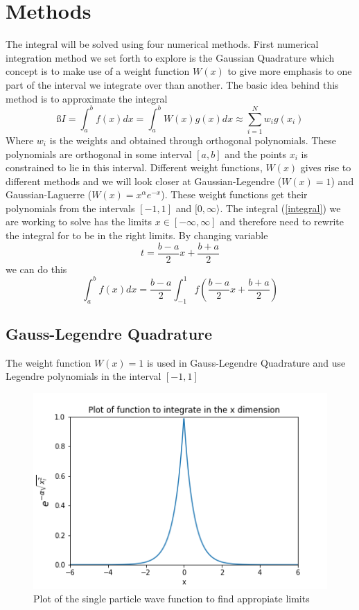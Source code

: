 \documentclass[twoside,twocolumn]{article}
\begin{document}
\section{Methods}
The integral will be solved using four numerical methods. First numerical integration method  we set forth to explore is the Gaussian Quadrature which concept is to make use of a weight function $W(x)$ to give more emphasis to one part of the interval we integrate over than another. The basic idea behind this method is to approximate the integral
\begin{equation}ß
   I = \int_{a}^{b}f(x)dx = \int_{a}^{b} W(x)g(x) dx \approx\sum_{i=1}^{N} w_ig(x_i)
\end{equation}
Where $w_i$ is the weights and obtained through orthogonal polynomials. These polynomials are orthogonal in some interval $[a,b]$ and the points $x_i$ is constrained to lie in this interval. Different weight functions, $W(x)$ gives rise to different methods and we will look  closer at Gaussian-Legendre ($W(x) = 1$) and Gaussian-Laguerre ($W(x)  = x^\alpha e^{-x}$). These weight functions get their polynomials from the intervals $[-1,1]$ and $[0,\infty\rangle$. The integral (\ref{integral})
we are working to solve has the limits $x\in[-\infty,\infty]$ and therefore need to rewrite the integral for to be in the right limits. By changing variable
\begin{equation}
		t= \frac{b-a}{2}x + \frac{b+a}{2}
\end{equation}
we can do this
\begin{equation}
		\int_a^b f(x) dx = \frac{b-a}{2} \int_{-1}^1f( \frac{b-a}{2}x + \frac{b+a}{2})
\end{equation}


\subsection{Gauss-Legendre Quadrature}
The weight function $W(x) = 1$ is used in Gauss-Legendre Quadrature and use Legendre polynomials in the interval $[-1,1]$

\begin{figure}[h]
\center
\includegraphics[scale=0.55]{figure1.png}
\caption{Plot of the single particle wave function to find appropiate limits}
\end{figure}
\end{document}
